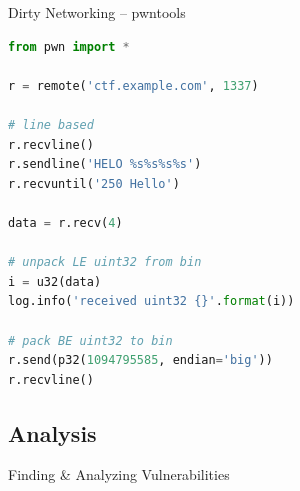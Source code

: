 
\begin{frame}[fragile]
  {Dirty Networking -- pwntools}

  \begin{lstlisting}[language=python]
from pwn import *

r = remote('ctf.example.com', 1337)

# line based
r.recvline()
r.sendline('HELO %s%s%s%s')
r.recvuntil('250 Hello')

data = r.recv(4)

# unpack LE uint32 from bin
i = u32(data)
log.info('received uint32 {}'.format(i))

# pack BE uint32 to bin
r.send(p32(1094795585, endian='big'))
r.recvline()
  \end{lstlisting}
\end{frame}


\subsection{Analysis}

{
\begin{frame}[plain]

  {\huge Finding \& Analyzing Vulnerabilities}

  \vspace{16em}

\end{frame}
}


